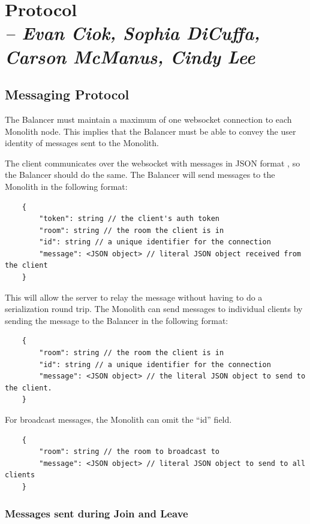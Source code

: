 \chapter{Protocol \\
  \small{\textit{-- Evan Ciok, Sophia DiCuffa, Carson McManus, Cindy Lee}}
  \label{Chapter::Protocol}}

\section{Messaging Protocol}

The Balancer must maintain a maximum of one websocket  connection to each Monolith  node. This implies that the Balancer  must be able to convey the user identity of messages sent to the Monolith.

The client communicates over the websocket with messages in JSON  format , so the Balancer should do the same. The Balancer will send messages to the Monolith in the following format:

\begin{verbatim}
	{
		"token": string // the client's auth token
		"room": string // the room the client is in
		"id": string // a unique identifier for the connection
		"message": <JSON object> // literal JSON object received from the client
	}
\end{verbatim}

This will allow the server to relay the message without having to do a serialization round trip. The Monolith can send messages to individual clients by sending the message to the Balancer in the following format:

\begin{verbatim}
	{
		"room": string // the room the client is in
		"id": string // a unique identifier for the connection
		"message": <JSON object> // the literal JSON object to send to the client.
	}
\end{verbatim}

For broadcast messages, the Monolith can omit the ``id'' field.

\begin{verbatim}
	{
		"room": string // the room to broadcast to
		"message": <JSON object> // literal JSON object to send to all clients
	}
\end{verbatim}



\subsection{Messages sent during Join and Leave}

